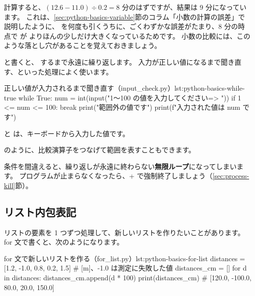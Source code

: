 計算すると、$(12.6 - 11.0) \div 0.2 = 8$ 分のはずですが、結果は 9 分になっています。
これは、\ref{sec:python-basics-variable}節のコラム「小数の計算の誤差」で説明したように、 を何度も引くうちに、ごくわずかな誤差がたまり、8 分の時点で  が  よりほんの少しだけ大きくなっているためです。
小数の比較には、このような落とし穴があることを覚えておきましょう。

 と書くと、 するまで永遠に繰り返します。
入力が正しい値になるまで聞き直す、といった処理によく使います。

\begin{codelisting}[style=python]{正しい値が入力されるまで聞き直す（input\_check.py）}{lst:python-basics-while-true}
while True:
    num = int(input("1〜100 の値を入力してください=> "))
    if 1 <= num <= 100:
        break
    print("範囲外の値です")
print(f"入力された値は {num} です")
\end{codelisting}


 と  は、キーボードから入力した値です。

 のように、比較演算子をつなげて範囲を表すこともできます。

\begin{caution}[無限ループ]
  条件を間違えると、繰り返しが永遠に終わらない\textbf{無限ループ}になってしまいます。
  プログラムが止まらなくなったら、+ で強制終了しましょう（\ref{sec:process-kill}節）。
\end{caution}

\subsection{リスト内包表記}
\label{sec:python-basics-comprehension}

リストの要素を 1 つずつ処理して、新しいリストを作りたいことがあります。
for 文で書くと、次のようになります。

\begin{codelisting}[style=python]{for 文で新しいリストを作る（for\_list.py）}{lst:python-basics-for-list}
distances = [1.2, -1.0, 0.8, 0.2, 1.5]   # [m]、-1.0 は測定に失敗した値
distances_cm = []
for d in distances:
    distances_cm.append(d * 100)
print(distances_cm)   # [120.0, -100.0, 80.0, 20.0, 150.0]
\end{codelisting}


